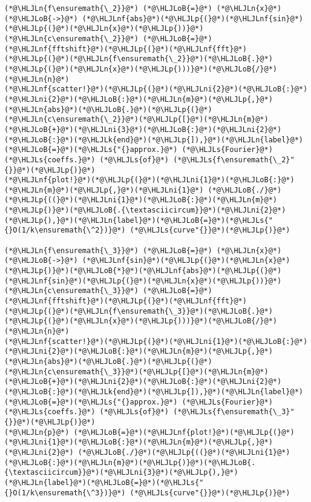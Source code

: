\documentclass[12pt,a4paper]{article}
\newcommand{\HLJLk}[1]{\textcolor[RGB]{148,91,176}{\textbf{#1}}}
\newcommand{\HLJLn}[1]{#1}
\newcommand{\HLJLnf}[1]{\textcolor[RGB]{66,102,213}{#1}}
\newcommand{\HLJLs}[1]{\textcolor[RGB]{201,61,57}{#1}}
\newcommand{\HLJLni}[1]{\textcolor[RGB]{59,151,46}{#1}}
\newcommand{\HLJLoB}[1]{\textcolor[RGB]{102,102,102}{\textbf{#1}}}
\newcommand{\HLJLp}[1]{#1}
\begin{document}
\begin{lstlisting}
(*@\HLJLn{f\ensuremath{\_2}}@*) (*@\HLJLoB{=}@*) (*@\HLJLn{x}@*) (*@\HLJLoB{->}@*) (*@\HLJLnf{abs}@*)(*@\HLJLp{(}@*)(*@\HLJLnf{sin}@*)(*@\HLJLp{(}@*)(*@\HLJLn{x}@*)(*@\HLJLp{))}@*)
(*@\HLJLn{c\ensuremath{\_2}}@*) (*@\HLJLoB{=}@*) (*@\HLJLnf{fftshift}@*)(*@\HLJLp{(}@*)(*@\HLJLnf{fft}@*)(*@\HLJLp{(}@*)(*@\HLJLn{f\ensuremath{\_2}}@*)(*@\HLJLoB{.}@*)(*@\HLJLp{(}@*)(*@\HLJLn{x}@*)(*@\HLJLp{)))}@*)(*@\HLJLoB{/}@*)(*@\HLJLn{n}@*)
(*@\HLJLnf{scatter!}@*)(*@\HLJLp{(}@*)(*@\HLJLni{2}@*)(*@\HLJLoB{:}@*)(*@\HLJLni{2}@*)(*@\HLJLoB{:}@*)(*@\HLJLn{m}@*)(*@\HLJLp{,}@*)(*@\HLJLn{abs}@*)(*@\HLJLoB{.}@*)(*@\HLJLp{(}@*)(*@\HLJLn{c\ensuremath{\_2}}@*)(*@\HLJLp{[}@*)(*@\HLJLn{m}@*)(*@\HLJLoB{+}@*)(*@\HLJLni{3}@*)(*@\HLJLoB{:}@*)(*@\HLJLni{2}@*)(*@\HLJLoB{:}@*)(*@\HLJLk{end}@*)(*@\HLJLp{]),}@*)(*@\HLJLn{label}@*)(*@\HLJLoB{=}@*)(*@\HLJLs{"{}approx.}@*) (*@\HLJLs{Fourier}@*) (*@\HLJLs{coeffs.}@*) (*@\HLJLs{of}@*) (*@\HLJLs{f\ensuremath{\_2}"{}}@*)(*@\HLJLp{)}@*)
(*@\HLJLnf{plot!}@*)(*@\HLJLp{(}@*)(*@\HLJLni{1}@*)(*@\HLJLoB{:}@*)(*@\HLJLn{m}@*)(*@\HLJLp{,}@*)(*@\HLJLni{1}@*) (*@\HLJLoB{./}@*)(*@\HLJLp{((}@*)(*@\HLJLni{1}@*)(*@\HLJLoB{:}@*)(*@\HLJLn{m}@*)(*@\HLJLp{)}@*)(*@\HLJLoB{.{\textasciicircum}}@*)(*@\HLJLni{2}@*)(*@\HLJLp{),}@*)(*@\HLJLn{label}@*)(*@\HLJLoB{=}@*)(*@\HLJLs{"{}O(1/k\ensuremath{\^2})}@*) (*@\HLJLs{curve"{}}@*)(*@\HLJLp{)}@*)

(*@\HLJLn{f\ensuremath{\_3}}@*) (*@\HLJLoB{=}@*) (*@\HLJLn{x}@*) (*@\HLJLoB{->}@*) (*@\HLJLnf{sin}@*)(*@\HLJLp{(}@*)(*@\HLJLn{x}@*)(*@\HLJLp{)}@*)(*@\HLJLoB{*}@*)(*@\HLJLnf{abs}@*)(*@\HLJLp{(}@*)(*@\HLJLnf{sin}@*)(*@\HLJLp{(}@*)(*@\HLJLn{x}@*)(*@\HLJLp{))}@*)
(*@\HLJLn{c\ensuremath{\_3}}@*) (*@\HLJLoB{=}@*) (*@\HLJLnf{fftshift}@*)(*@\HLJLp{(}@*)(*@\HLJLnf{fft}@*)(*@\HLJLp{(}@*)(*@\HLJLn{f\ensuremath{\_3}}@*)(*@\HLJLoB{.}@*)(*@\HLJLp{(}@*)(*@\HLJLn{x}@*)(*@\HLJLp{)))}@*)(*@\HLJLoB{/}@*)(*@\HLJLn{n}@*)
(*@\HLJLnf{scatter!}@*)(*@\HLJLp{(}@*)(*@\HLJLni{1}@*)(*@\HLJLoB{:}@*)(*@\HLJLni{2}@*)(*@\HLJLoB{:}@*)(*@\HLJLn{m}@*)(*@\HLJLp{,}@*)(*@\HLJLn{abs}@*)(*@\HLJLoB{.}@*)(*@\HLJLp{(}@*)(*@\HLJLn{c\ensuremath{\_3}}@*)(*@\HLJLp{[}@*)(*@\HLJLn{m}@*)(*@\HLJLoB{+}@*)(*@\HLJLni{2}@*)(*@\HLJLoB{:}@*)(*@\HLJLni{2}@*)(*@\HLJLoB{:}@*)(*@\HLJLk{end}@*)(*@\HLJLp{]),}@*)(*@\HLJLn{label}@*)(*@\HLJLoB{=}@*)(*@\HLJLs{"{}approx.}@*) (*@\HLJLs{Fourier}@*) (*@\HLJLs{coeffs.}@*) (*@\HLJLs{of}@*) (*@\HLJLs{f\ensuremath{\_3}"{}}@*)(*@\HLJLp{)}@*)
(*@\HLJLn{p}@*) (*@\HLJLoB{=}@*)(*@\HLJLnf{plot!}@*)(*@\HLJLp{(}@*)(*@\HLJLni{1}@*)(*@\HLJLoB{:}@*)(*@\HLJLn{m}@*)(*@\HLJLp{,}@*)(*@\HLJLni{2}@*) (*@\HLJLoB{./}@*)(*@\HLJLp{((}@*)(*@\HLJLni{1}@*)(*@\HLJLoB{:}@*)(*@\HLJLn{m}@*)(*@\HLJLp{)}@*)(*@\HLJLoB{.{\textasciicircum}}@*)(*@\HLJLni{3}@*)(*@\HLJLp{),}@*)(*@\HLJLn{label}@*)(*@\HLJLoB{=}@*)(*@\HLJLs{"{}O(1/k\ensuremath{\^3})}@*) (*@\HLJLs{curve"{}}@*)(*@\HLJLp{)}@*)
\end{lstlisting}
\end{document}
